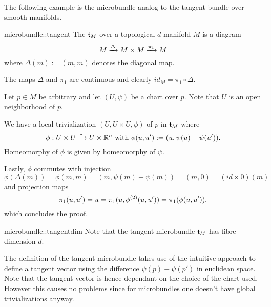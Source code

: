 \begin{myparagraph}
    The following example is the microbundle analog
    to the tangent bundle over smooth manifolds.
\end{myparagraph}

\begin{myexample}{microbundle::tangent}{}
    The  $\mathfrak{t}_M$ over a topological $d$-manifold $M$ is a diagram
    \[ M \xrightarrow{\Delta} M \times M \xrightarrow{\pi_1} M{} \]
    where $\Delta(m) := (m, m)$ denotes the diagonal map.
\end{myexample}

\begin{myproof}
    The maps $\Delta$ and $\pi_1$ are continuous and clearly $id_M = \pi_1 \circ \Delta$.

    Let $p \in M$ be arbitrary and let $(U, \psi)$ be a chart over $p$.
    Note that $U$ is an open neighborhood of $p$.
    
    We have a local trivialization $(U, U \times U, \phi)$ of $p$ in $\mathfrak{t}_M$ where
    \[ \phi: U \times U \xrightarrow{\sim} U \times \mathbb{R}^n \text{ with } \phi(u, u') := (u, \psi(u) - \psi(u')). \]
    Homeomorphy of $\phi$ is given by homeomorphy of $\psi$.

    Lastly, $\phi$ commutes with injection
    \[ \phi(\Delta(m)) = \phi(m, m) = (m, \psi(m) - \psi(m)) = (m, 0) = (id \times 0)(m)\]
    and projection maps
    \[ \pi_1(u, u') = u = \pi_1(u, \phi^{(2)}(u, u')) = \pi_1(\phi(u, u')). \]
    which concludes the proof.
\end{myproof}

\begin{myremark}{microbundle::tangentdim}{}
    Note that the tangent microbundle $\mathfrak{t}_M$ has fibre dimension $d$.
\end{myremark}

\begin{myparagraph}
    The definition of the tangent microbundle
    takes use of the intuitive approach to define a tangent vector
    using the difference $\psi(p) - \psi(p')$ in euclidean space.
    Note that the tangent vector is hence dependant
    on the choice of the chart used.
    However this causes no problems since
    for microbundles one doesn't have global trivializations anyway.
\end{myparagraph}